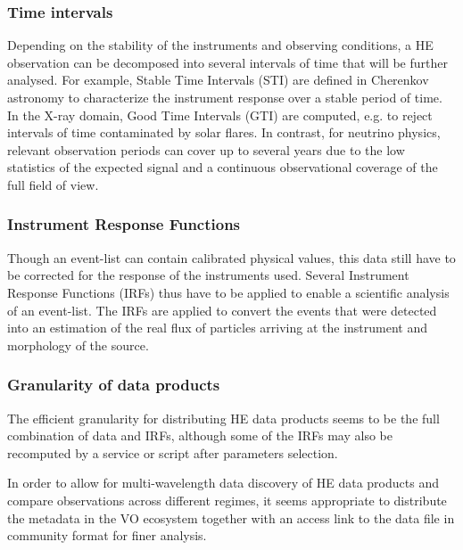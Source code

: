 \documentclass[11pt,a4paper]{ivoa}
\begin{document}
\subsubsection{Time intervals}

Depending on the stability of the instruments and observing conditions, a HE observation can be decomposed into several intervals of time that will be further analysed.
For example, Stable Time Intervals (STI) are defined in Cherenkov astronomy to characterize the instrument response over a stable period of time. In the X-ray domain, Good Time Intervals (GTI) are computed, e.g. to reject intervals of time contaminated by solar flares. In contrast, for neutrino physics, relevant observation periods can cover up to several years due to the low statistics of the expected signal and a continuous observational coverage of the full field of view.


\subsubsection{Instrument Response Functions}

Though an event-list can contain calibrated physical values, this data still have to be corrected for the response of the instruments used. Several {Instrument Response Functions (IRFs)} thus have to be applied to enable a scientific analysis of an event-list. The IRFs are applied to convert the events that were detected into an estimation of the real flux of particles arriving at the instrument and morphology of the source.

\subsubsection{Granularity of data products}

The efficient granularity for distributing HE data products seems to be the full combination of data and IRFs, although some of the IRFs may also be recomputed by a service or script after parameters selection.

In order to allow for multi-wavelength data discovery of HE data products and compare observations across different regimes, it seems appropriate to distribute the metadata in the VO ecosystem together with an access link to the data file in community format for finer analysis.

\end{document}
